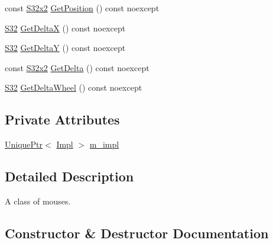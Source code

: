 \begin{DoxyCompactItemize}
\item 
const \hyperlink{namespacemage_a02de5a44f35ee9917e5788d63795fece}{S32x2} \hyperlink{classmage_1_1input_1_1_mouse_a8127f78dd1fb1eba29c3888d40db97da}{Get\+Position} () const noexcept
\item 
\hyperlink{namespacemage_a642e05c5c83642b6946703615cdbf2da}{S32} \hyperlink{classmage_1_1input_1_1_mouse_ac15719c468a94885a256e34b27cf2ca5}{Get\+DeltaX} () const noexcept
\item 
\hyperlink{namespacemage_a642e05c5c83642b6946703615cdbf2da}{S32} \hyperlink{classmage_1_1input_1_1_mouse_a448886ed21c136f1a385101e21093aa3}{Get\+DeltaY} () const noexcept
\item 
const \hyperlink{namespacemage_a02de5a44f35ee9917e5788d63795fece}{S32x2} \hyperlink{classmage_1_1input_1_1_mouse_a6f789e976d80c6f9c92388e3cf3502d6}{Get\+Delta} () const noexcept
\item 
\hyperlink{namespacemage_a642e05c5c83642b6946703615cdbf2da}{S32} \hyperlink{classmage_1_1input_1_1_mouse_a71d088496a46d2915eb3fb8ba7dbb8e5}{Get\+Delta\+Wheel} () const noexcept
\end{DoxyCompactItemize}
\subsection*{Private Attributes}
\begin{DoxyCompactItemize}
\item 
\hyperlink{namespacemage_a3316d7143a973e37adf1110f2e80ca31}{Unique\+Ptr}$<$ \hyperlink{classmage_1_1input_1_1_mouse_1_1_impl}{Impl} $>$ \hyperlink{classmage_1_1input_1_1_mouse_a9056beca36df1fd7947cf7002aec99b6}{m\+\_\+impl}
\end{DoxyCompactItemize}


\subsection{Detailed Description}
A class of mouses. 

\subsection{Constructor \& Destructor Documentation}
\hypertarget{classmage_1_1input_1_1_mouse_add3fd231e5af4f3669eaa8d5f8d157ec}{}\label{classmage_1_1input_1_1_mouse_add3fd231e5af4f3669eaa8d5f8d157ec} 
